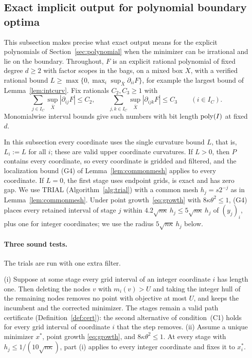 \subsection{Exact implicit output for polynomial boundary optima}\label{app:boundary}

This subsection makes precise what exact output means for the explicit
polynomials of Section~\ref{sec:polynomial} when the minimizer can be
irrational and lie on the boundary. Throughout, $F$ is an explicit rational
polynomial of fixed degree $d\ge2$ with factor scopes in the bags, on a mixed
box $X$, with a verified rational bound
$L\ge\max\{0,\max_i\sup_{\bar X}\partial_{ii}F\}$,
for example the largest bound of Lemma~\ref{lem:intcurv}. Fix rationals
$C_2,C_3\ge1$ with
\[
\sum_{j\in I_C}\sup_{\bar X}|\partial_{ij}F|\le C_2,\qquad
\sum_{j,k\in I_C}\sup_{\bar X}|\partial_{ijk}F|\le C_3
\qquad(i\in I_C).
\]
Monomialwise interval bounds give such numbers with bit length $\operatorname{poly}(I)$
at fixed $d$.

In this subsection every coordinate uses the single curvature bound $L$, that
is, $L_i:=L$ for all $i$; these are valid upper coordinate curvatures. If
$L>0$, then $P$ contains every coordinate, so every coordinate is gridded and
filtered, and the localization bound (G4) of Lemma~\ref{lem:commonmesh}
applies to every coordinate. If $L=0$, the first stage uses endpoint grids,
is exact and has zero gap. We use TRIAL (Algorithm~\ref{alg:trial}) with a
common mesh $h_j=s2^{-j}$ as in Lemma~\ref{lem:commonmesh}. Under point
growth~\eqref{eq:growth} with $8\kappa\theta^2\le1$, (G4) places every
retained interval of stage $j$ within
$4.2\sqrt{n\kappa}\,h_j\le5\sqrt{n\kappa}\,h_j$ of $(y_j)_i$, plus one for
integer coordinates; we use the radius $5\sqrt{n\kappa}\,h_j$ below.

\paragraph{Three sound tests.}
The trials are run with one extra filter.

\begin{lemma}\label{lem:labelfilter}
(i) Suppose at some stage every grid interval of an integer coordinate $i$
has length one. Then deleting the nodes $v$ with $m_i(v)>U$ and taking the
integer hull of the remaining nodes removes no point with objective at most
$U$, and keeps the incumbent and the corrected minimizer. The stages remain a
valid path certificate (Definition~\ref{def:cert}): the second alternative of
condition~(C1) holds for every grid interval of coordinate $i$ that the step
removes.
(ii) Assume a unique minimizer $x^*$, point growth \eqref{eq:growth}, and
$8\kappa\theta^2\le1$. At every stage with $h_j\le1/(10\sqrt{n\kappa})$,
part (i) applies to every integer coordinate and fixes it to $x^*_i$.
\end{lemma}


